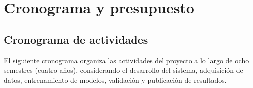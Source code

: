 
\chapter{Cronograma y presupuesto}

\label{Chapter4}


\section{Cronograma de actividades}

El siguiente cronograma organiza las actividades del proyecto a lo largo de ocho semestres (cuatro años), considerando el desarrollo del sistema, adquisición de datos, entrenamiento de modelos, validación y publicación de resultados.\\

